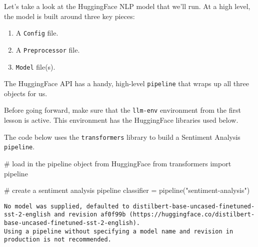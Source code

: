 \documentclass[
  letterpaper,
  DIV=11,
  numbers=noendperiod]{scrartcl}
\newenvironment{Shaded}{\begin{snugshade}}{\end{snugshade}}
\newcommand{\CommentTok}[1]{\textcolor[rgb]{0.37,0.37,0.37}{#1}}
\newcommand{\ImportTok}[1]{\textcolor[rgb]{0.00,0.46,0.62}{#1}}
\newcommand{\NormalTok}[1]{\textcolor[rgb]{0.00,0.23,0.31}{#1}}
\newcommand{\OperatorTok}[1]{\textcolor[rgb]{0.37,0.37,0.37}{#1}}
\newcommand{\StringTok}[1]{\textcolor[rgb]{0.13,0.47,0.30}{#1}}
\providecommand{\tightlist}{%
  \setlength{\itemsep}{0pt}\setlength{\parskip}{0pt}}\usepackage{longtable,booktabs,array}
\begin{document}
Let's take a look at the HuggingFace NLP model that we'll run. At a high
level, the model is built around three key pieces:

\begin{enumerate}
\def\labelenumi{\arabic{enumi}.}
\tightlist
\item
  A \texttt{Config} file.\\
\item
  A \texttt{Preprocessor} file.\\
\item
  \texttt{Model} file(s).
\end{enumerate}

The HuggingFace API has a handy, high-level \texttt{pipeline} that wraps
up all three objects for us.

\begin{tcolorbox}[enhanced jigsaw, leftrule=.75mm, colbacktitle=quarto-callout-important-color!10!white, title=\textcolor{quarto-callout-important-color}{\faExclamation}\hspace{0.5em}{Important}, left=2mm, opacitybacktitle=0.6, toprule=.15mm, coltitle=black, opacityback=0, arc=.35mm, colframe=quarto-callout-important-color-frame, breakable, bottomtitle=1mm, bottomrule=.15mm, colback=white, rightrule=.15mm, titlerule=0mm, toptitle=1mm]

Before going forward, make sure that the \texttt{llm-env} environment
from the first lesson is active. This environment has the HuggingFace
libraries used below.

\end{tcolorbox}

The code below uses the \texttt{transformers} library to build a
Sentiment Analysis \texttt{pipeline}.

\begin{Shaded}
\begin{Highlighting}[]
\CommentTok{\# load in the pipeline object from HuggingFace}
\ImportTok{from}\NormalTok{ transformers }\ImportTok{import}\NormalTok{ pipeline}

\CommentTok{\# create a sentiment analysis pipeline}
\NormalTok{classifier }\OperatorTok{=}\NormalTok{ pipeline(}\StringTok{"sentiment{-}analysis"}\NormalTok{)}
\end{Highlighting}
\end{Shaded}

\begin{verbatim}
No model was supplied, defaulted to distilbert-base-uncased-finetuned-sst-2-english and revision af0f99b (https://huggingface.co/distilbert-base-uncased-finetuned-sst-2-english).
Using a pipeline without specifying a model name and revision in production is not recommended.
\end{verbatim}
\end{document}
